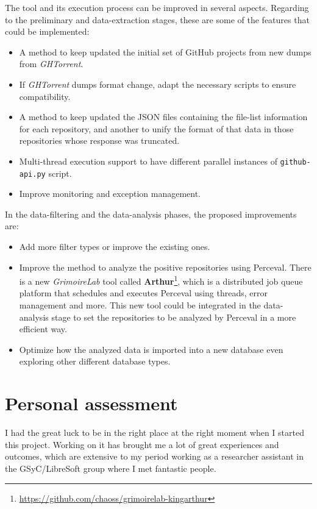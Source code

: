 \documentclass[a4paper, 12pt]{book}
\begin{document}
The tool and its execution process can be improved in several aspects. Regarding to the preliminary and data-extraction
stages, these are some of the features that could be implemented:
\begin{itemize}
    \item A method to keep updated the initial set of GitHub projects from new dumps from \emph{GHTorrent}.
    \item If \emph{GHTorrent} dumps format change, adapt the necessary scripts to ensure compatibility.
    \item A method to keep updated the JSON files containing the file-list information for
    each repository, and another to unify the format of that data in those repositories whose response was truncated.
    \item Multi-thread execution support to have different parallel instances of \texttt{github-api.py} script.
    \item Improve monitoring and exception management.
\end{itemize}

In the data-filtering and the data-analysis phases, the proposed improvements are:
\begin{itemize}
    \item Add more filter types or improve the existing ones.
    \item Improve the method to analyze the positive repositories using Perceval. There is a new \emph{GrimoireLab}
    tool called \textbf{Arthur}\footnote{\url{https://github.com/chaoss/grimoirelab-kingarthur}},
    which is a distributed job queue platform that schedules and executes Perceval using threads, error management and more.
    This new tool could be integrated in the data-analysis stage to set the repositories to be analyzed by Perceval
    in a more efficient way.
    \item Optimize how the analyzed data is imported into a new database even exploring other different database types.
\end{itemize}

\section{Personal assessment}
\label{sec:assessment}
I had the great luck to be in the right place at the right moment when I started this project.
Working on it has brought me a lot of great experiences and outcomes, which are
extensive to my period working as a researcher assistant in the GSyC/LibreSoft group where I met fantastic people.
\end{document}
